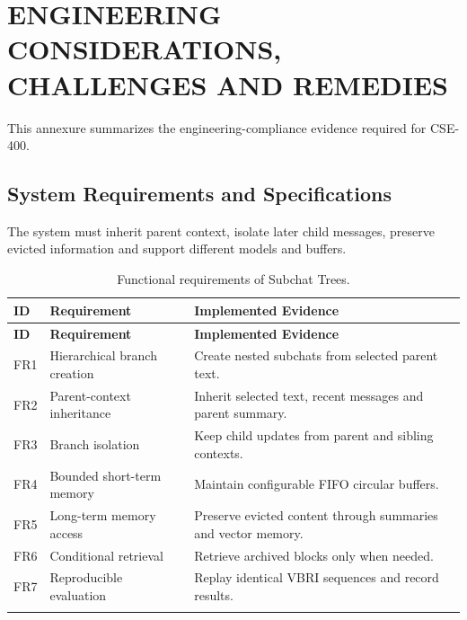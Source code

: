 \chapter{ENGINEERING CONSIDERATIONS, CHALLENGES AND REMEDIES}
\label{annex:engineering_considerations}
\vspace{-3em}

This annexure summarizes the engineering-compliance evidence required for CSE-400.

\section{System Requirements and Specifications}

The system must inherit parent context, isolate later child messages, preserve evicted information and support different models and buffers.

\begin{longtable}{p{}p{}p{}}
\caption{Functional requirements of Subchat Trees.}\label{tab:annexA_functional_requirements}\\
\toprule
\textbf{ID} & \textbf{Requirement} & \textbf{Implemented Evidence} \\
\midrule
\endfirsthead
\toprule
\textbf{ID} & \textbf{Requirement} & \textbf{Implemented Evidence} \\
\midrule
\endhead
FR1 & Hierarchical branch creation & Create nested subchats from selected parent text. \\
FR2 & Parent-context inheritance & Inherit selected text, recent messages and parent summary. \\
FR3 & Branch isolation & Keep child updates from parent and sibling contexts. \\
FR4 & Bounded short-term memory & Maintain configurable FIFO circular buffers. \\
FR5 & Long-term memory access & Preserve evicted content through summaries and vector memory. \\
FR6 & Conditional retrieval & Retrieve archived blocks only when needed. \\
FR7 & Reproducible evaluation & Replay identical VBRI sequences and record results. \\
\botrule
\end{longtable}

